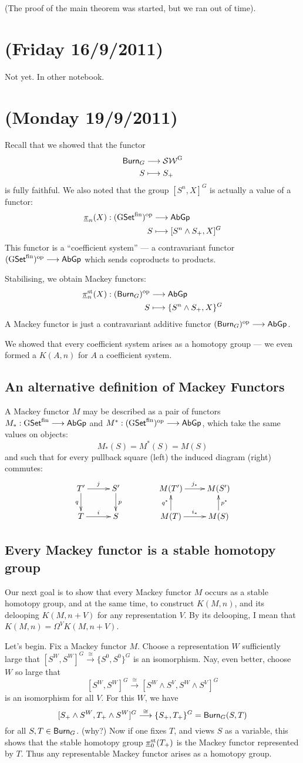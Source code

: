 \documentclass[11pt]{article}
\newcommand{\rednote}[1]{{\color{red}#1}\scalebox{.1}{rednote}}
\newcommand{\funcdef}[4]{\begin{align*}
#1&\to #2\\
#3&\mapsto#4
\end{align*}}
\newcommand{\NewLecture}[3]{\section{#1 {\small(#2/#3/2011)}}}
\begin{document}
\rednote{(The proof of the main theorem was started, but we ran out of time).}
\NewLecture{}{Friday 16}{9} Not yet. In other notebook.
\NewLecture{}{Monday 19}{9} Recall that
we showed that the functor
\funcdef{\Burnside_G}{\GSW}{S}{S_+}
is fully faithful. We also noted that the group $[S^n,X]^G$ is actually a value of a functor:
\funcdef{\underline{\pi}_n(X):(\FinGSet)^\op}{\AbGp}{S}{[S^n\wedge S_+,X]^G}
This functor is a ``coefficient system'' --- a contravariant functor $(\operatorname{{G\mathsf{Set}^\textup{fin}}})^{\textup{op}}\longrightarrow\operatorname{{\mathsf{AbGp}}}$ which sends coproducts to products.

Stabilising, we obtain Mackey functors:
\funcdef{\underline{\pi}_n^\st(X):(\Burnside_G)^\op}{\AbGp}{S}{\{S^n\wedge S_+,X\}^G}
A Mackey functor is just a contravariant additive functor $(\operatorname{{\mathsf{Burn}}}_G)^{\textup{op}}\longrightarrow\operatorname{{\mathsf{AbGp}}}$.

We showed that every coefficient system arises as a homotopy group --- we even formed a $K(A,n)$ for $A$ a coefficient system.
\subsection*{An alternative definition of Mackey Functors}
A Mackey functor $M$ may be described as a pair of functors $M_*:\operatorname{{G\mathsf{Set}^\textup{fin}}}\longrightarrow\operatorname{{\mathsf{AbGp}}}$ and $M^*:(\operatorname{{G\mathsf{Set}^\textup{fin}}})^{\textup{op}}\longrightarrow\operatorname{{\mathsf{AbGp}}}$, which take the same values on objects:
\[M_*(S)=M^*(S)=M(S)\]
and such that for every pullback square (left) the induced diagram (right) commutes:
\[\xymatrix@!0@R=12mm@C=1.5cm{
\ar[d]_qT'\ar[r]^j&S'\ar[d]^p\\
T\ar[r]^i&S
}\qquad\qquad\xymatrix@!0@R=12mm@C=2.05cm{
\ar[d];[]^{q^*}M(T')\ar[r]^{j_*}&M(S')\ar[d];[]_{p^*}\\
M(T)\ar[r]^{i_*}&M(S)
}\]
\subsection*{Every Mackey functor is a stable homotopy group}
Our next goal is to show that every Mackey functor $M$ occurs as a stable homotopy group, and at the same time, to construct $K(M,n)$, and its delooping $K(M,n+V)$ for any representation $V$. By its delooping, I mean that $K(M,n)=\Omega^VK(M,n+V)$.

Let's begin. Fix a Mackey functor $M$. Choose a representation $W$ sufficiently large that $[S^W,S^W]^G\overset{\cong}{\to}\{S^0,S^0\}^G$ is an isomorphism. Nay, even better, choose $W$ so large that
\[[S^W,S^W]^G\overset{\cong}{\to} [S^W\wedge S^V,S^W\wedge S^V]^G\]
is an isomorphism for all $V$. For this $W$, we have
\[[S_+\wedge S^W,T_+\wedge S^W]^G\overset{\cong}{\longrightarrow}\{S_+,T_+\}^G=\operatorname{{\mathsf{Burn}}}_G(S,T)\]
for all $S,T\in\operatorname{{\mathsf{Burn}}}_G$. \rednote{(why?)}
Now if one fixes $T$, and views $S$ as a variable, this shows that the stable homotopy group $\underline\pi_0^{\textup{st}} (T_+)$ is the Mackey functor represented by $T$. Thus any representable Mackey functor arises as a homotopy group.
\end{document}
